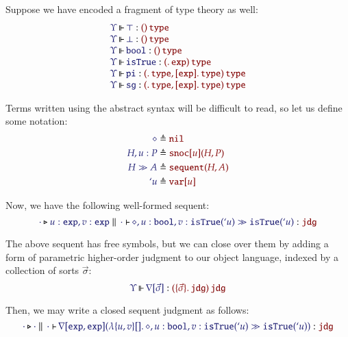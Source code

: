 \documentclass[11pt]{article}
\theoremstyle{definition}
\theoremstyle{remark}
\numberwithin{equation}{section}
\def\IModeColorName{MidnightBlue}
\def\OModeColorName{Maroon}
\newcommand\IMode[1]{{\color{\IModeColorName}{#1}}}
\newcommand\OMode[1]{{\color{\OModeColorName}{#1}}}
\newcommand\MkValence[3]{%
  \ifthenelse{\equal{#1}{}}{}{%
    \{#1\}%
  }%
  \ifthenelse{\equal{#2}{}}{}{%
    [#2]%
  }.\, #3%
}
\newcommand\MkBTm[3]{\mathbb{\lambda}\{#1\}[#2].\, #3}
\newcommand\MkArity[2]{(#1)\, #2}
\newcommand\IsOperator[3]{
  \IMode{#1}\,{\Vdash}\,\IMode{#2}: \OMode{#3}
}
\newcommand\IsAbt[5]{%
  \IMode{#1}\triangleright%
  \IMode{#2}\parallel%
  \,{\IMode{#3}\vdash}\,%
  \IMode{#4}:\OMode{#5}%
}
\newcommand\App[2]{#1(#2)}
\newcommand\SortExp{\mathtt{exp}}
\begin{document}
\newcommand\OpPi{\mathtt{pi}}
\newcommand\OpSg{\mathtt{sg}}
\newcommand\OpBool{\mathtt{bool}}
\newcommand\OpSo{\mathtt{isTrue}}

Suppose we have encoded a fragment of type theory as well:
\[
  \begin{array}{l}
    \IsOperator{\Upsilon}{\top}{
      \MkArity{}{\SortType}
    }\\
    \IsOperator{\Upsilon}{\bot}{
      \MkArity{}{\SortType}
    }\\
    \IsOperator{\Upsilon}{\OpBool}{
      \MkArity{}{\SortType}
    }\\
    \IsOperator{\Upsilon}{\OpSo}{
      \MkArity{
        \MkValence{}{}{\SortExp}
      }{\SortType}
    }\\
    \IsOperator{\Upsilon}{\OpPi}{
      \MkArity{
        \MkValence{}{}{\SortType},
        \MkValence{}{\SortExp}{\SortType}
      }{\SortType}
    }\\
    \IsOperator{\Upsilon}{\OpSg}{
      \MkArity{
        \MkValence{}{}{\SortType},
        \MkValence{}{\SortExp}{\SortType}
      }{\SortType}
    }\\
  \end{array}
\]

Terms written using the abstract syntax will be difficult to read, so let us
define some notation:
\begin{align*}
  \IMode{\diamond} &\triangleq \OMode{\OpNil}\\
  \IMode{H, u:P} &\triangleq \OMode{
    \App{\OpSnoc{u}}{H, P}
  }\\
  \IMode{H\gg A} &\triangleq \OMode{
    \App{\OpSequent}{
      H, A
    }
  }\\
  \IMode{`u} &\triangleq \OMode{\OpVar{u}}
\end{align*}

Now, we have the following well-formed sequent:
\[
  \IsAbt{\cdot}{
    u:\SortExp,
    v:\SortExp
  }{\cdot}{
    \diamond,u:\OpBool,v:\App{\OpSo}{`u}%
    \gg%
    \App{\OpSo}{`u}
  }{\SortJdg}
\]

\newcommand\OpNabla[1]{\nabla[#1]}

The above sequent has free symbols, but we can close over them by adding a form
of parametric higher-order judgment to our object language, indexed by a
collection of sorts $\vec{\sigma}$:
\[
  \IsOperator{\Upsilon}{\OpNabla{\vec{\sigma}}}{
    \MkArity{
      \MkValence{\vec{\sigma}}{}{\SortJdg}
    }{\SortJdg}
  }
\]

Then, we may write a closed sequent judgment as follows:
\[
  \IsAbt{\cdot}{\cdot}{\cdot}{
    \App{\OpNabla{\SortExp,\SortExp}}{
      \MkBTm{u,v}{}{
        \diamond,u:\OpBool,v:\App{\OpSo}{`u}%
        \gg%
        \App{\OpSo}{`u}
      }
    }
  }{\SortJdg}
\]
\end{document}
